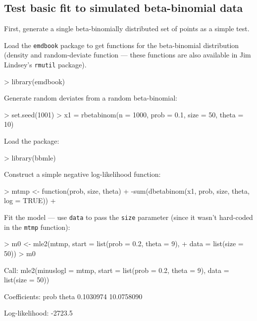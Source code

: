 \documentclass{article}
\newcommand{\code}[1]{{\tt #1}}
\begin{document}
\subsection{Test basic fit to simulated beta-binomial data}

First, generate a single beta-binomially distributed
set of points as a simple test.

Load the \code{emdbook} package
to get functions for the beta-binomial distribution (density and random-deviate 
function --- these functions are also available
in Jim Lindsey's \code{rmutil} package).
\begin{Schunk}
\begin{Sinput}
> library(emdbook)
\end{Sinput}
\end{Schunk}

Generate random deviates from a random beta-binomial:
\begin{Schunk}
\begin{Sinput}
> set.seed(1001)
> x1 = rbetabinom(n = 1000, prob = 0.1, size = 50, theta = 10)
\end{Sinput}
\end{Schunk}

Load the package:
\begin{Schunk}
\begin{Sinput}
> library(bbmle)
\end{Sinput}
\end{Schunk}

Construct a simple negative log-likelihood function:
\begin{Schunk}
\begin{Sinput}
> mtmp <- function(prob, size, theta) {
+     -sum(dbetabinom(x1, prob, size, theta, log = TRUE))
+ }
\end{Sinput}
\end{Schunk}

Fit the model --- use \code{data} to pass the \code{size}
parameter (since it wasn't hard-coded in the \code{mtmp}
function):
\begin{Schunk}
\begin{Sinput}
> m0 <- mle2(mtmp, start = list(prob = 0.2, theta = 9), 
+     data = list(size = 50))
> m0
\end{Sinput}
\begin{Soutput}
Call:
mle2(minuslogl = mtmp, start = list(prob = 0.2, theta = 9), data = list(size = 50))

Coefficients:
      prob      theta 
 0.1030974 10.0758090 

Log-likelihood: -2723.5 
\end{Soutput}
\end{Schunk}
\end{document}
